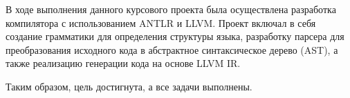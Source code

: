 \conclusion

В ходе выполнения данного курсового проекта была осуществлена разработка компилятора с использованием ANTLR и LLVM. Проект включал в себя создание грамматики для определения структуры языка, разработку парсера для преобразования исходного кода в абстрактное синтаксическое дерево (AST), а также реализацию генерации кода на основе LLVM IR.

Таким образом, цель достигнута, а все задачи выполнены.
